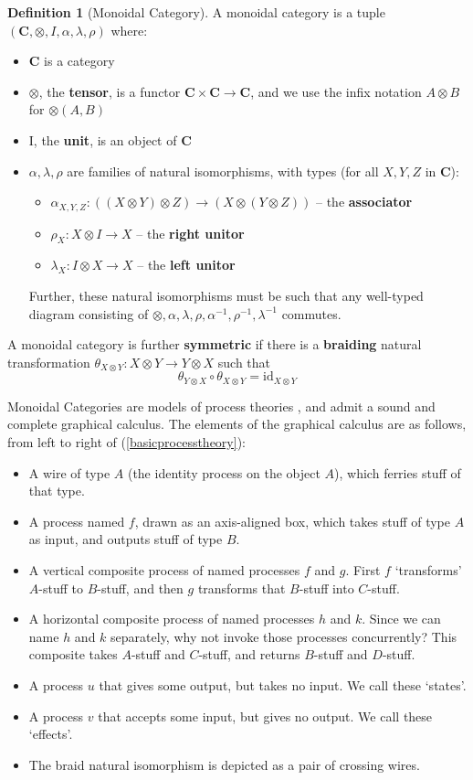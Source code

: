 \documentclass[11pt]{article}
\newcommand{\cat}{\mathbf}
\theoremstyle{definition}
\newtheorem{defn}{Definition}
\theoremstyle{plain}
\begin{document}
\begin{defn}[Monoidal Category]
A monoidal category is a tuple $(\cat{C},\otimes,I,\alpha,\lambda,\rho)$ where:
\begin{itemize}
\item{$\cat{C}$ is a category}
\item{$\otimes$, the \textbf{tensor}, is a functor $\cat{C} \times \cat{C} \rightarrow \cat{C}$, and we use the infix notation $A \otimes B$ for $\otimes(A,B)$}
\item{I, the \textbf{unit}, is an object of $\cat{C}$}
\item{$\alpha,\lambda,\rho$ are families of natural isomorphisms, with types (for all $X,Y,Z$ in $\cat{C}$):
\begin{itemize}
\item{$\alpha_{X,Y,Z}: ((X \otimes Y)\otimes Z) \rightarrow (X \otimes (Y\otimes Z))$ -- the \textbf{associator}}
\item{$\rho_X: X \otimes I \rightarrow X$ -- the \textbf{right unitor}}
\item{$\lambda_X: I \otimes X \rightarrow X$ -- the \textbf{left unitor}}
\end{itemize}
Further, these natural isomorphisms must be such that any well-typed diagram consisting of $\otimes,\alpha,\lambda,\rho,\alpha^{-1},\rho^{-1},\lambda^{-1}$ commutes.}
\end{itemize}
A monoidal category is further \textbf{symmetric} if there is a \textbf{braiding} natural transformation $\theta_{X\otimes Y}: X \otimes Y \rightarrow Y \otimes X$ such that $$\theta_{Y \otimes X} \circ \theta_{X \otimes Y} = \text{id}_{X \otimes Y}$$
\end{defn}

Monoidal Categories are models of process theories \cite{bob_coecke_aleks_kissinger_picturing_2017}, and admit a sound and complete graphical calculus. The elements of the graphical calculus are as follows, from left to right of (\ref{basicprocesstheory}):
\begin{itemize}
\item{A wire of type $A$ (the identity process on the object $A$), which ferries stuff of that type.}
\item{A process named $f$, drawn as an axis-aligned box, which takes stuff of type $A$ as input, and outputs stuff of type $B$.}
\item{A vertical composite process of named processes $f$ and $g$. First $f$ `transforms' $A$-stuff to $B$-stuff, and then $g$ transforms that $B$-stuff into $C$-stuff.}
\item{A horizontal composite process of named processes $h$ and $k$. Since we can name $h$ and $k$ separately, why not invoke those processes concurrently? This composite takes $A$-stuff and $C$-stuff, and returns $B$-stuff and $D$-stuff.}
\item{A process $u$ that gives some output, but takes no input. We call these `states'.}
\item{A process $v$ that accepts some input, but gives no output. We call these `effects'.}
\item{The braid natural isomorphism is depicted as a pair of crossing wires.}
\end{itemize}
\end{document}
